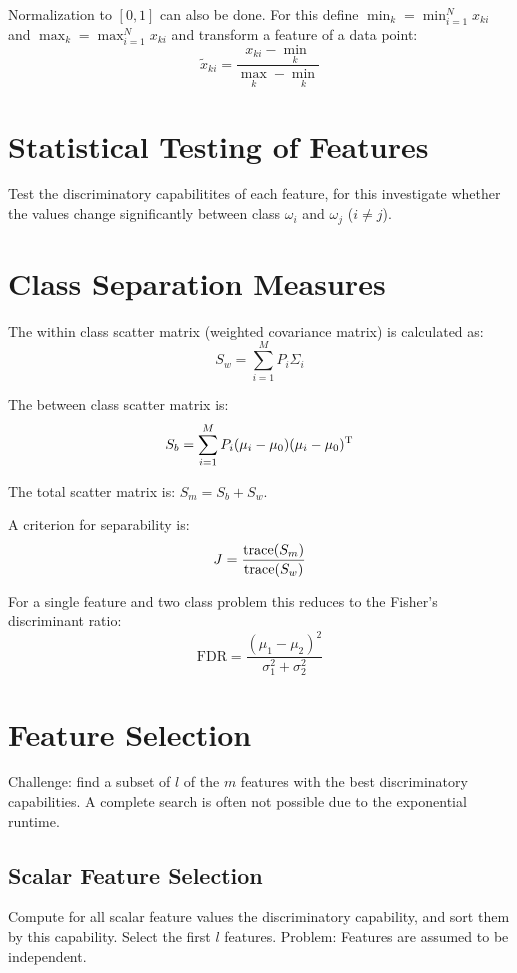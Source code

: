 Normalization to $[0,1]$ can also be done. For this define $\min_k = \min_{i=1}^N x_{ki}$ and $\max_k = \max_{i=1}^N x_{ki}$ and transform a feature of a data point:
\begin{equation*}
    \tilde{x}_{ki} = \frac{x_{ki} - \min_k}{\max_k - \min_k}
\end{equation*}

\section{Statistical Testing of Features}
Test the discriminatory capabilitites of each feature, for this investigate whether the values change significantly between class $\omega_i$ and $\omega_j$ ($i \neq j$).

\section{Class Separation Measures}
The within class scatter matrix (weighted covariance matrix) is calculated as:
\begin{equation*}
    S_w = \sum_{i=1}^M P_i \Sigma_i
\end{equation*}

The between class scatter matrix is:
\begin{equation*}
    S_b = \sum_{i=1}^M P_i (\mu_i - \mu_0) (\mu_i - \mu_0)^\text{T}
\end{equation*}

The total scatter matrix is: $S_m = S_b + S_w$.

A criterion for separability is:
\begin{equation*}
    J = \frac{\operatorname*{trace}(S_m)}{\operatorname*{trace}(S_w)}
\end{equation*}

For a single feature and two class problem this reduces to the Fisher's discriminant ratio:
\begin{equation*}
    \text{FDR} = \frac{{(\mu_1 - \mu_2)}^2}{\sigma_1^2 + \sigma_2^2 }
\end{equation*}

\section{Feature Selection}
Challenge: find a subset of $l$ of the $m$ features with the best discriminatory capabilities.
A complete search is often not possible due to the exponential runtime. 

\subsection{Scalar Feature Selection}
Compute for all scalar feature values the discriminatory capability, and sort them by this capability. Select the first $l$ features. Problem: Features are assumed to be independent.

